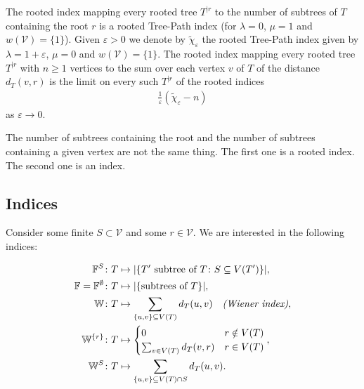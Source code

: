 \documentclass[11 pt]{modarticle}
\newcommand{\vset}{\mathcal{V}}
\newcommand{\wmap}{w}
\newcommand{\size}[1]{|#1|}
\newcommand{\vsetof}[1]{V(#1)}
\newcommand{\distance}[3]{d_{#3}(#1,#2)}
\newcommand{\rtree}[2]{{#1}^{\lvert #2}}
\begin{document}
The rooted index mapping every rooted tree $\rtree{T}{r}$ to the number of subtrees of $T$ containing the root $r$ is a rooted Tree-Path index (for $\lambda = 0$, $\mu = 1$ and $\wmap(\vset) = \{1\}$). Given $\varepsilon > 0$ we denote by $\widetilde{\chi}_{\varepsilon}$ the rooted Tree-Path index given by $\lambda = 1 + \varepsilon$, $\mu = 0$ and $\wmap(\vset) = \{1\}$. The rooted index mapping every rooted tree $\rtree{T}{r}$ with $n \geq 1$ vertices to the sum over each vertex $v$ of $T$ of the distance $\distance{v}{r}{T}$ is the limit on every such $\rtree{T}{r}$ of the rooted indices
\begin{eqnarray*}
	\frac{1}{\varepsilon}(\widetilde{\chi}_{\varepsilon} - n)
\end{eqnarray*}
as $\varepsilon \rightarrow 0$.

\begin{rem}
The number of subtrees containing the root and the number of subtrees containing a given vertex are not the same thing. The first one is a rooted index. The second one is an index.
\end{rem}

\subsection{Indices}

Consider some finite $S \subset \vset$ and some $r \in \vset$. We are interested in the following indices:

\begin{align*}
    \mathbb{F}^S \colon T &\mapsto \size{\{T' \text{ subtree of } T \colon S \subseteq V(T')\}},\\
    \mathbb{F} = \mathbb{F}^{\emptyset} \colon T &\mapsto \size{\{\text{subtrees of } T\}},\\
    \mathbb{W} \colon T &\mapsto \sum_{\{u,v\} \subseteq \vsetof{T}} \distance{u}{v}{T} \quad \text{\emph{(Wiener index)}},\\
    \mathbb{W}^{\{r\}} \colon T &\mapsto \begin{cases} 0 &r \notin V(T) \\ \sum_{v \in V(T)} \distance{v}{r}{T} &r \in \vsetof{T} \end{cases},\\
    \mathbb{W}^S \colon T &\mapsto \sum_{\{u,v\} \subseteq \vsetof{T} \cap S} \distance{u}{v}{T}.
\end{align*}


\end{document}
